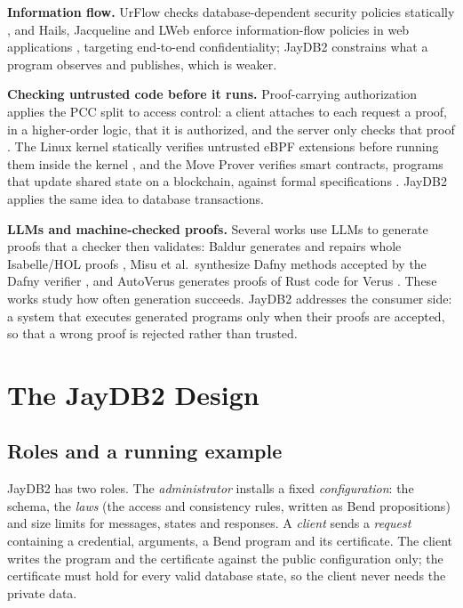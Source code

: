 \documentclass[12pt]{article}
\begin{document}
\textbf{Information flow.} UrFlow checks database-dependent security policies
statically \cite{urflow2010}, and Hails, Jacqueline and LWeb enforce
information-flow policies in web applications
\cite{hails2012,jacqueline2016,lweb2019}, targeting end-to-end confidentiality;
JayDB2 constrains what a program observes and publishes, which is weaker.

\textbf{Checking untrusted code before it runs.} Proof-carrying
authorization applies the PCC split to access control: a client attaches to
each request a proof, in a higher-order logic, that it is authorized, and the
server only checks that proof \cite{appel1999}. The Linux kernel statically
verifies untrusted eBPF extensions before running them inside the kernel
\cite{gershuni2019}, and the Move Prover verifies smart contracts, programs that
update shared state on a blockchain, against formal specifications
\cite{moveprover2020}. JayDB2 applies the same idea to database transactions.

\textbf{LLMs and machine-checked proofs.} Several works use LLMs to generate proofs
that a checker then validates: Baldur generates and repairs whole
Isabelle/HOL proofs \cite{baldur2023}, Misu et al.\ synthesize Dafny methods
accepted by the Dafny verifier \cite{misu2024}, and AutoVerus generates proofs
of Rust code for Verus \cite{autoverus2025}. These works study how often
generation succeeds. JayDB2 addresses the consumer side: a system that executes
generated programs only when their proofs are accepted, so that a wrong proof is
rejected rather than trusted.

\section{The JayDB2 Design}
\label{sec:design}
\subsection{Roles and a running example}
JayDB2 has two roles. The \emph{administrator} installs a fixed
\emph{configuration}: the schema, the \emph{laws} (the access and consistency
rules, written as Bend propositions) and size limits for messages, states and
responses. A \emph{client} sends a \emph{request} containing a credential,
arguments, a Bend program and its certificate. The client writes the program and
the certificate against the public configuration only; the certificate must hold
for every valid database state, so the client never needs the private data.
\end{document}
